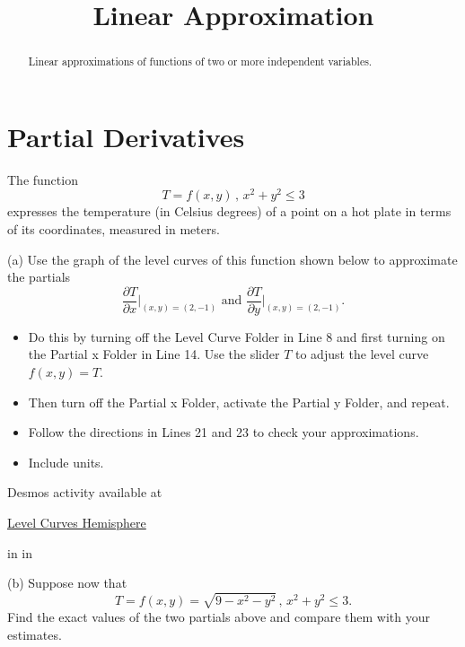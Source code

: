 \documentclass{ximera}
\title{Linear Approximation}
\newcommand{\pskip}{\vskip 0.1 in}
\begin{document}
\begin{abstract}
Linear approximations of functions of two or more independent variables.
\end{abstract}
\maketitle


\section{Partial Derivatives}

\begin{example}  \label{Edgtr543}

The function
\[
    T = f(x,y) \, , \, x^2 + y^2 \leq 3
\]
expresses the temperature (in Celsius degrees) of a point on a hot plate in terms of its coordinates, measured in meters. 

(a) Use the graph of the level curves of this function shown below to approximate the partials 
\[
    \frac{\partial T}{\partial x}\Big|_{(x,y)=(2,-1)} \text{ and } \frac{\partial T}{\partial y}\Big|_{(x,y)=(2,-1)} .
\]

\begin{itemize}
\item{Do this by turning off the Level Curve Folder in Line 8 and first turning on the Partial x Folder in Line 14. Use the slider $T$ to adjust the level curve $f(x,y)=T$.} 

\item{Then turn off the Partial x Folder, activate the Partial y Folder, and repeat.}

\item{Follow the directions in Lines 21 and 23 to check your approximations.}

\item{Include units.}

\end{itemize}

 
\begin{onlineOnly}
    \begin{center}
\end{center}
\end{onlineOnly}

Desmos activity available at

\href{https://www.desmos.com/calculator/et6f10fnti}{Level Curves Hemisphere}

\pskip \pskip

(b) Suppose now that 
\[
    T = f(x,y) = \sqrt{9-x^2-y^2} \, , \, x^2 + y^2 \leq 3 .
\]
Find the exact values of the two partials above and compare them with your estimates.

\end{example}
\end{document}
